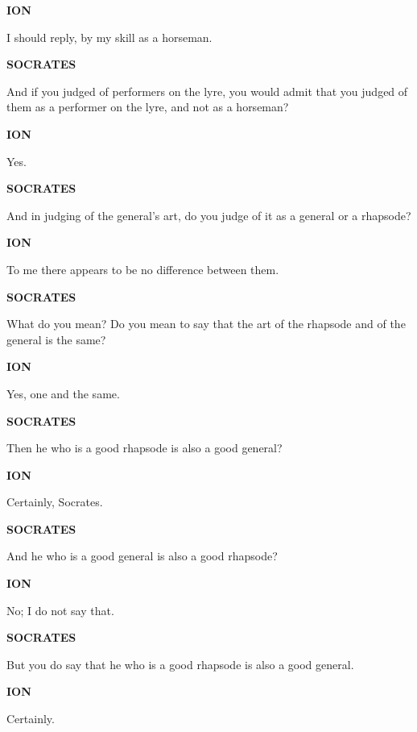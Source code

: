 \documentclass[11pt,letter]{article}
\begin{document}
\par \textbf{ION}
\par   I should reply, by my skill as a horseman.

\par \textbf{SOCRATES}
\par   And if you judged of performers on the lyre, you would admit that you judged of them as a performer on the lyre, and not as a horseman?

\par \textbf{ION}
\par   Yes.

\par \textbf{SOCRATES}
\par   And in judging of the general's art, do you judge of it as a general or a rhapsode?

\par \textbf{ION}
\par   To me there appears to be no difference between them.

\par \textbf{SOCRATES}
\par   What do you mean? Do you mean to say that the art of the rhapsode and of the general is the same?

\par \textbf{ION}
\par   Yes, one and the same.

\par \textbf{SOCRATES}
\par   Then he who is a good rhapsode is also a good general?

\par \textbf{ION}
\par   Certainly, Socrates.

\par \textbf{SOCRATES}
\par   And he who is a good general is also a good rhapsode?

\par \textbf{ION}
\par   No; I do not say that.

\par \textbf{SOCRATES}
\par   But you do say that he who is a good rhapsode is also a good general.

\par \textbf{ION}
\par   Certainly.
\end{document}
